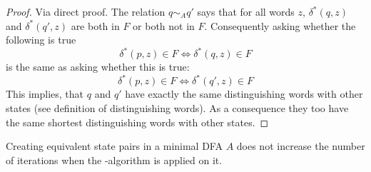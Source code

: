 \begin{proof}
    Via direct proof. The relation $q \sim_A q'$ says that for all words $z$, $\delta^*(q,z)$ and $\delta^*(q',z)$ are both in $F$ or both not in $F$. Consequently asking whether the following is true
    \[
    	\delta^*(p,z)\in F \Leftrightarrow \delta^*(q,z)\in F
    \]
    is the same as asking whether this is true:
    \[
    	\delta^*(p,z)\in F \Leftrightarrow \delta^*(q',z)\in F
    \]
    This implies, that $q$ and $q'$ have exactly the same distinguishing words with other states (see definition of distinguishing words). As a consequence they too have the same shortest distinguishing words with other states.
\end{proof}

\begin{theorem}
	Creating equivalent state pairs in a minimal DFA $A$ does not increase the number of iterations when the \CompDist-algorithm is applied on it.
\end{theorem}

